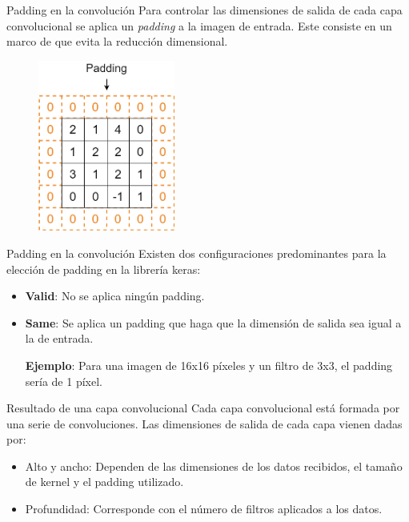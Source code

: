 \begin{frame}{Padding en la convolución}
Para controlar las \alert{dimensiones de salida} de cada capa convolucional se aplica un \textit{\alert{padding}} a la imagen de entrada. Este consiste en un marco de  que evita la reducción dimensional.

\begin{figure}
    \centering
    \includegraphics[width=0.4\textwidth]{figures/Tema 2/Padding.png}
\end{figure}
\end{frame}

\begin{frame}{Padding en la convolución}
Existen dos \alert{configuraciones} predominantes para la elección de padding en la librería \alert{keras}:
\begin{itemize}
    \item \textbf{\alert{Valid}}: No se aplica \alert{ningún} padding.
    \item \textbf{\alert{Same}}: Se aplica un padding que haga que la \alert{dimensión de salida} sea igual a la de \alert{entrada}.
    
    \vfill
    {\large \textbf{Ejemplo}: Para una imagen de 16x16 píxeles y un filtro de 3x3, el padding  sería de 1 píxel.}
\end{itemize}
\end{frame}

\begin{frame}{Resultado de una capa convolucional}
Cada \alert{capa convolucional} está formada por una serie de convoluciones. Las \alert{dimensiones de salida} de cada capa vienen dadas por:
\begin{itemize}
    \item \alert{Alto y ancho}: Dependen de las dimensiones de los \alert{datos recibidos}, el tamaño de \alert{kernel} y el \alert{padding} utilizado.
    \item \alert{Profundidad}: Corresponde con el \alert{número de filtros} aplicados a los datos.
\end{itemize}
\end{frame}

